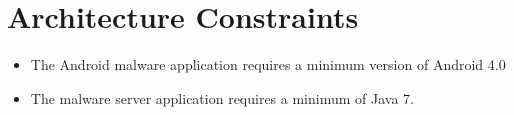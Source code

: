 \section{Architecture Constraints}
	\begin{itemize}
		\item The Android malware application requires a minimum version of Android 4.0
		\item The malware server application requires a minimum of Java 7.
	\end{itemize}